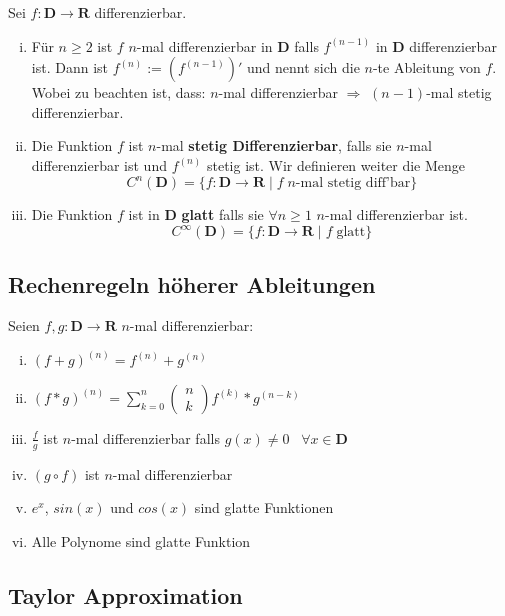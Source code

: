 \documentclass[8pt]{extarticle}
\begin{document}
\begin{multicols*}{3}
Sei $f: \mathbf{D} \rightarrow \mathbf{R}$ differenzierbar.
\begin{enumerate}[(i)]
  \item Für $n \geq 2$ ist $f$ $n$-mal differenzierbar in $\mathbf{D}$
  falls $f^{(n-1)}$ in $\mathbf{D}$ differenzierbar ist. Dann ist $f^{(n)} := (f^{(n-1)})'$
  und nennt sich die $n$-te Ableitung von $f$. Wobei zu beachten ist, dass: $n$-mal differenzierbar $\Rightarrow$ $(n-1)$-mal stetig differenzierbar.
  \item Die Funktion $f$ ist $n$-mal \textbf{stetig Differenzierbar}, falls sie $n$-mal
  differenzierbar ist und $f^{(n)}$ stetig ist. Wir definieren weiter die Menge $$C^n(\mathbf{D}) = \{f: \mathbf{D} \rightarrow \mathbf{R} \;|\; f\;n\text{-mal stetig diff'bar}\}$$
  \item Die Funktion $f$ ist in $\mathbf{D}$ \textbf{glatt} falls sie $\forall n \geq 1$ $n$-mal differenzierbar ist.
  $$C^\infty(\mathbf{D}) = \{f: \mathbf{D} \rightarrow \mathbf{R} \;|\; f\;\text{glatt}\}$$
\end{enumerate}

\subsection{Rechenregeln höherer Ableitungen}

Seien $f, g: \mathbf{D} \rightarrow \mathbf{R}$ $n$-mal differenzierbar:
\begin{enumerate}[(i)]
  \item $(f + g)^{(n)} = f^{(n)} + g^{(n)}$
  \item $(f * g)^{(n)} = \sum_{k = 0}^{n} \begin{pmatrix}
    n\\
    k
  \end{pmatrix} f^{(k)} * g^{(n - k)}$
  \item $\frac{f}{g}$ ist $n$-mal differenzierbar falls $g(x) \neq 0 \;\;\; \forall x \in \mathbf{D}$
  \item $(g \circ f)$ ist $n$-mal differenzierbar
  \item $e^x$, $sin(x)$ und $cos(x)$ sind glatte Funktionen
  \item Alle Polynome sind glatte Funktion
\end{enumerate}

\subsection{Taylor Approximation}


\end{multicols*}
\end{document}
